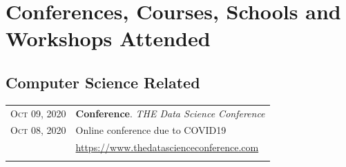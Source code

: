 \documentclass[a4paper,10pt]{article} %
\begin{document}
\section{Conferences, Courses, Schools and Workshops Attended}
\bigskip
\subsection*{Computer Science Related}

\begin{tabular}{r|p{11cm}}

		

		

			

			

	\textsc{Oct 09, 2020} & \small \textbf{Conference}. \textit{THE Data Science Conference}\\
	\textsc{Oct 08, 2020} & \small Online conference due to COVID19\\
	&\url{https://www.thedatascienceconference.com}\\
	\multicolumn{2}{c}{} \\


\end{tabular}
\end{document}
